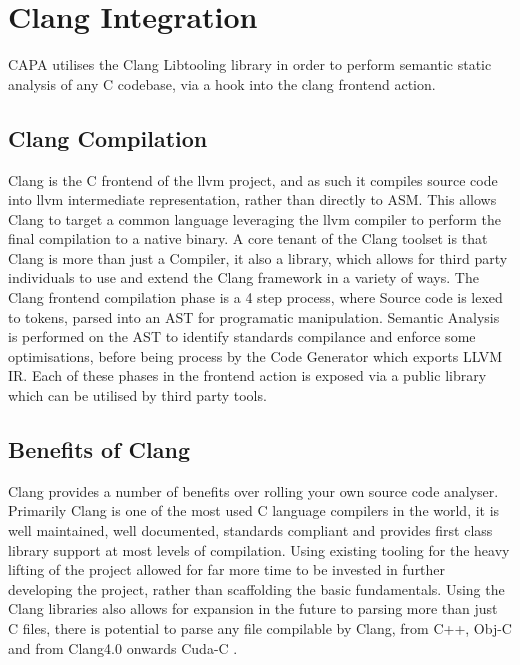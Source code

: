 
\section{Clang Integration} %
CAPA utilises the Clang Libtooling library in order to perform semantic static analysis of any C
codebase, via a hook into the clang frontend action.

\subsection{Clang Compilation}
Clang is the C frontend of the llvm project, and as such it compiles source code into llvm
intermediate representation, rather than directly to ASM. This allows Clang to target a common
language leveraging the llvm compiler to perform the final compilation to a native binary. A core
tenant of the Clang toolset is that Clang is more than just a Compiler, it also a library, which
allows for third party individuals to use and extend the Clang framework in a variety of ways.
\cite{clangFeatures}
The Clang frontend compilation phase is a 4 step process, where Source code is lexed to tokens,
parsed into an AST for programatic manipulation. Semantic Analysis is performed on the AST to
identify standards compilance and enforce some optimisations, before being process by the Code
Generator which exports LLVM IR. Each of these phases in the frontend action is exposed via a public
library which can be utilised by third party tools.

\subsection{Benefits of Clang}
Clang provides a number of benefits over rolling your own source code analyser. Primarily Clang is
one of the most used C language compilers in the world, it is well maintained, well documented,
standards compliant and provides first class library support at most levels of compilation. Using
existing tooling for the heavy lifting of the project allowed for far more time to be invested in
further developing the project, rather than scaffolding the basic fundamentals. Using the Clang
libraries also allows for expansion in the future to parsing more than just C files, there is
potential to parse any file compilable by Clang, from C++, Obj-C and from Clang4.0 onwards Cuda-C
\cite{clangFeatures}.

